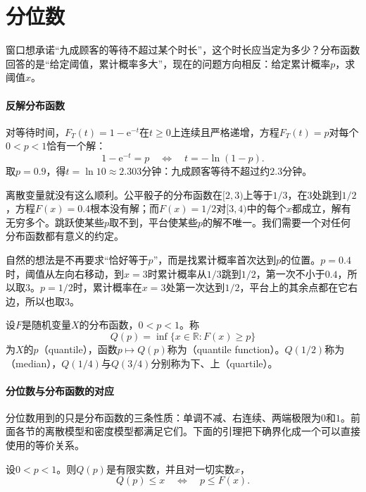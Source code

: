 \section{分位数}
\label{sec:rvd-quantiles}

窗口想承诺“九成顾客的等待不超过某个时长”，这个时长应当定为多少？分布函数回答的是“给定阈值，累计概率多大”，现在的问题方向相反：给定累计概率$p$，求阈值$x$。

\paragraph{反解分布函数}
对等待时间，$F_T(t)=1-\mathrm{e}^{-t}$在$t\geq0$上连续且严格递增，方程$F_T(t)=p$对每个$0<p<1$恰有一个解：
\[
  1-\mathrm{e}^{-t}=p\quad\Longleftrightarrow\quad t=-\ln(1-p).
\]
取$p=0.9$，得$t=\ln10\approx2.303$分钟：九成顾客等待不超过约$2.3$分钟。

离散变量就没有这么顺利。公平骰子的分布函数在$[2,3)$上等于$1/3$，在$3$处跳到$1/2$，方程$F(x)=0.4$根本没有解；而$F(x)=1/2$对$[3,4)$中的每个$x$都成立，解有无穷多个。跳跃使某些$p$取不到，平台使某些$p$的解不唯一。我们需要一个对任何分布函数都有意义的约定。

自然的想法是不再要求“恰好等于$p$”，而是找累计概率首次达到$p$的位置。$p=0.4$时，阈值从左向右移动，到$x=3$时累计概率从$1/3$跳到$1/2$，第一次不小于$0.4$，所以取$3$。$p=1/2$时，累计概率在$x=3$处第一次达到$1/2$，平台上的其余点都在它右边，所以也取$3$。

\begin{definition}[分位数]
\label{def:rvd-quantile}
设$F$是随机变量$X$的分布函数，$0<p<1$。称
\begin{equation}
  Q(p)=\inf\{x\in\mathbb{R}:F(x)\geq p\}
  \label{eq:rvd-quantile}
\end{equation}
为$X$的$p$（quantile），函数$p\mapsto Q(p)$称为（quantile function）。$Q(1/2)$称为（median），$Q(1/4)$与$Q(3/4)$分别称为下、上（quartile）。
\end{definition}

\paragraph{分位数与分布函数的对应}
分位数用到的只是分布函数的三条性质：单调不减、右连续、两端极限为$0$和$1$。前面各节的离散模型和密度模型都满足它们。下面的引理把下确界化成一个可以直接使用的等价关系。

\begin{lemma}[分位数的等价刻画]
\label{lem:rvd-quantile-galois}
设$0<p<1$。则$Q(p)$是有限实数，并且对一切实数$x$，
\begin{equation}
  Q(p)\leq x\quad\Longleftrightarrow\quad p\leq F(x).
  \label{eq:rvd-quantile-galois}
\end{equation}
\end{lemma}

